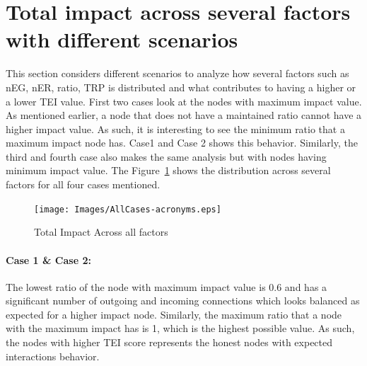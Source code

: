 \section{Total impact across several factors with different
scenarios}\label{Allcases}
This section considers different scenarios to analyze how several factors
such as \ac{nEG}, \ac{nER}, ratio, \ac{TRP} is distributed and what
contributes to having a higher or a lower \ac{TEI} value.  First two cases look
at the nodes with maximum impact value. As mentioned earlier, a node that does
not have a maintained ratio cannot have a higher impact value. As such, it is
interesting to see the minimum ratio that a maximum impact node has. Case1 and
Case 2 shows this behavior. Similarly, the third and fourth case also makes the
same analysis but with nodes having minimum impact value. The
Figure~\ref{fig:allCases} shows the distribution across several factors for all
four cases mentioned. 
\begin{figure}[h]
	\texttt{[image: Images/AllCases-acronyms.eps]}
	\caption{Total Impact Across all factors}
	\label{fig:allCases}
\end{figure}
\paragraph{Case 1 \& Case 2:}The lowest ratio of the node with maximum impact
value is 0.6 and has a significant number of outgoing and incoming connections
which looks balanced as expected for a higher impact node. Similarly, the
maximum ratio that a node with the maximum impact has is 1, which is the
highest possible value. As such, the nodes with higher \ac{TEI} score
represents the honest nodes with expected interactions behavior. 
